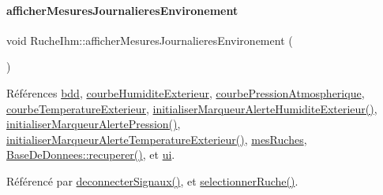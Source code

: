\paragraph{\texorpdfstring{afficher\+Mesures\+Journalieres\+Environement}{afficherMesuresJournalieresEnvironement}}
{\footnotesize\ttfamily void Ruche\+Ihm\+::afficher\+Mesures\+Journalieres\+Environement (\begin{DoxyParamCaption}{ }\end{DoxyParamCaption})\hspace{0.3cm}{\ttfamily [slot]}}



Références \hyperlink{class_ruche_ihm_a0851936fe212e8d40538264f09749153}{bdd}, \hyperlink{class_ruche_ihm_a0c9d769a392e3c1332f8908cd9d558eb}{courbe\+Humidite\+Exterieur}, \hyperlink{class_ruche_ihm_aa6685f1fc20aa4459eab3b0bb3c4d1ef}{courbe\+Pression\+Atmospherique}, \hyperlink{class_ruche_ihm_a68e72873a859840d3c91b147b8559118}{courbe\+Temperature\+Exterieur}, \hyperlink{class_ruche_ihm_ae572f3f2b76e8c9b14a699d3e29422ee}{initialiser\+Marqueur\+Alerte\+Humidite\+Exterieur()}, \hyperlink{class_ruche_ihm_a87e4e8d783ea0f15d6304ed604c7ddaa}{initialiser\+Marqueur\+Alerte\+Pression()}, \hyperlink{class_ruche_ihm_a410bcf0b7ac3ea7134af65d479802c48}{initialiser\+Marqueur\+Alerte\+Temperature\+Exterieur()}, \hyperlink{class_ruche_ihm_ab7741fa67b19cbb2da7eb12c58cf83c1}{mes\+Ruches}, \hyperlink{class_base_de_donnees_a77539baad389f5acf754cd2cd452403e}{Base\+De\+Donnees\+::recuperer()}, et \hyperlink{class_ruche_ihm_a64786058bd7f88ca2f1e9743bb27c25b}{ui}.



Référencé par \hyperlink{class_ruche_ihm_a348a76106f3072dd31a382c6025b8113}{deconnecter\+Signaux()}, et \hyperlink{class_ruche_ihm_a7324ae6ea574ccdad47783f466933157}{selectionner\+Ruche()}.


